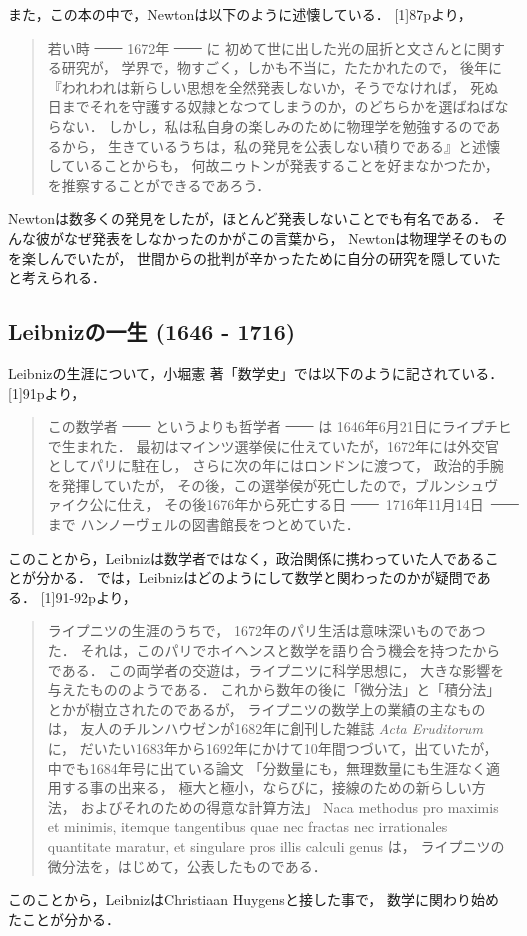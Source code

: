 \documentclass[11pt, a4paper]{jarticle}
\theoremstyle{definition}
\begin{document}
			また，この本の中で，Newtonは以下のように述懐している．
			[1]87pより，
			\begin{quotation}
				若い時 \sout{　　} 1672年 \sout{　　} に
				初めて世に出した光の屈折と文さんとに関する研究が，
				学界で，物すごく，しかも不当に，たたかれたので，
				後年に『われわれは新らしい思想を全然発表しないか，そうでなければ，
				死ぬ日までそれを守護する奴隷となつてしまうのか，のどちらかを選ばねばならない．
				しかし，私は私自身の楽しみのために物理学を勉強するのであるから，
				生きているうちは，私の発見を公表しない積りである』と述懐していることからも，
				何故ニゥトンが発表することを好まなかつたか，を推察することができるであろう．
			\end{quotation}
			Newtonは数多くの発見をしたが，ほとんど発表しないことでも有名である．
			そんな彼がなぜ発表をしなかったのかがこの言葉から，
			Newtonは物理学そのものを楽しんでいたが，
			世間からの批判が辛かったために自分の研究を隠していたと考えられる．

		\subsection{Leibnizの一生 (1646 - 1716)}
			Leibnizの生涯について，小堀憲 著「数学史」では以下のように記されている．
			[1]91pより，
			\begin{quotation}
				この数学者 \sout{　　} というよりも哲学者 \sout{　　} は
				1646年6月21日にライプチヒで生まれた．
				最初はマインツ選挙侯に仕えていたが，1672年には外交官としてパリに駐在し，
				さらに次の年にはロンドンに渡つて，	政治的手腕を発揮していたが，
				その後，この選挙侯が死亡したので，ブルンシュヴァイク公に仕え，
				その後1676年から死亡する日 \sout{　　}~1716年11月14日~\sout{　　} まで
				ハンノーヴェルの図書館長をつとめていた．
			\end{quotation}
			このことから，Leibnizは数学者ではなく，政治関係に携わっていた人であることが分かる．
			では，Leibnizはどのようにして数学と関わったのかが疑問である．
			[1]91-92pより，
			\begin{quotation}
				ライプニツの生涯のうちで，
				1672年のパリ生活は意味深いものであつた．
				それは，このパリでホイヘンスと数学を語り合う機会を持つたからである．
				この両学者の交遊は，ライプニツに科学思想に，
				大きな影響を与えたもののようである．
				これから数年の後に「微分法」と「積分法」とかが樹立されたのであるが，
				ライプニツの数学上の業績の主なものは，
				友人のチルンハウゼンが1682年に創刊した雑誌 \textit{Acta Eruditorum} に，
				だいたい1683年から1692年にかけて10年間つづいて，出ていたが，
				中でも1684年号に出ている論文
				「分数量にも，無理数量にも生涯なく適用する事の出来る，
				極大と極小，ならびに，接線のための新らしい方法，
				およびそれのための得意な計算方法」
				Naca methodus pro maximis et minimis,
				itemque tangentibus quae nec fractas nec irrationales quantitate maratur,
				et singulare pros illis calculi genus
				は，
				ライプニツの微分法を，はじめて，公表したものである．
			\end{quotation}
			このことから，LeibnizはChristiaan Huygensと接した事で，
			数学に関わり始めたことが分かる．
		
\end{document}

